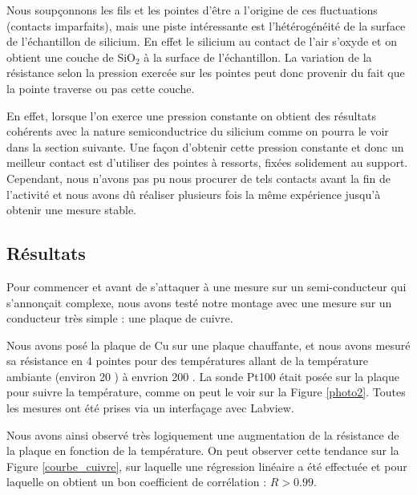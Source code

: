 \bigskip

Nous soupçonnons les fils et les pointes d'être a l'origine de ces fluctuations (contacts imparfaits), mais une piste intéressante est l'hétérogénéité de la surface de l'échantillon de silicium. 
En effet le silicium au contact de l'air s'oxyde et on obtient une couche de SiO$_2$ à la surface de l'échantillon. 
La variation de la résistance selon la pression exercée sur les pointes peut donc provenir du fait que la pointe 
traverse ou pas cette couche.

En effet, lorsque l'on exerce une pression constante on obtient des résultats cohérents avec la nature semiconductrice du silicium comme on pourra le voir dans la section suivante. Une façon d'obtenir cette pression constante et donc un meilleur contact est d'utiliser des pointes à ressorts, fixées solidement au support. Cependant, nous n'avons pas pu nous procurer de tels contacts avant la fin de l'activité et nous avons dû réaliser plusieurs fois la même expérience jusqu'à obtenir une mesure stable.

\subsection{Résultats}
Pour commencer et avant de s'attaquer à une mesure sur un semi-conducteur qui s'annonçait complexe, nous avons testé notre montage avec une mesure sur un conducteur très simple : une plaque de cuivre.

Nous avons posé la plaque de Cu sur une plaque chauffante, et nous avons mesuré sa résistance en 4 pointes pour des températures allant de la température ambiante (environ 20 \celsius{}) à envrion 200 \celsius{}. La sonde Pt100 était posée sur la plaque pour suivre la température, comme on peut le voir sur la Figure \ref{photo2}. Toutes les mesures ont été prises via un interfaçage avec Labview.

\bigskip

Nous avons ainsi observé très logiquement une augmentation de la résistance de la plaque en fonction de la température. On peut observer cette tendance sur la Figure \ref{courbe_cuivre}, sur laquelle une régression linéaire a été effectuée et pour laquelle on obtient un bon coefficient de corrélation : $R > 0.99$.

